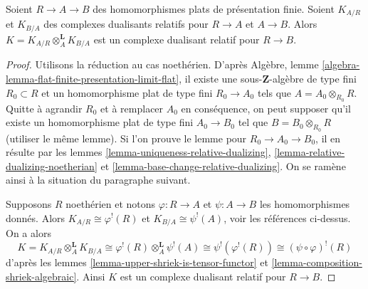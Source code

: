 \begin{lemma}
\label{lemma-relative-dualizing-composition}
Soient $R \to A \to B$ des homomorphismes plats de présentation finie.
Soient $K_{A/R}$ et $K_{B/A}$ des complexes dualisants relatifs pour $R \to A$ et $A \to B$.
Alors $K = K_{A/R} \otimes_A^\mathbf{L} K_{B/A}$ est un complexe dualisant relatif pour $R \to B$.
\end{lemma}

\begin{proof}
Utilisons la réduction au cas noethérien.
D'après Algèbre, lemme \ref{algebra-lemma-flat-finite-presentation-limit-flat}, il existe une sous-$\mathbf{Z}$-algèbre de type fini
$R_0 \subset R$ et un homomorphisme plat de type fini $R_0 \to A_0$ tels que $A = A_0 \otimes_{R_0} R$.
Quitte à agrandir $R_0$ et à remplacer $A_0$ en conséquence,
on peut supposer qu'il existe un homomorphisme plat de type fini $A_0 \to B_0$
tel que $B = B_0 \otimes_{R_0} R$ (utiliser le même lemme).
Si l'on prouve le lemme pour $R_0 \to A_0 \to B_0$, il en résulte
par les lemmes \ref{lemma-uniqueness-relative-dualizing}, \ref{lemma-relative-dualizing-noetherian} et \ref{lemma-base-change-relative-dualizing}.
On se ramène ainsi à la situation du paragraphe suivant.

\medskip\noindent
Supposons $R$ noethérien et notons $\varphi : R \to A$ et $\psi : A \to B$
les homomorphismes donnés. Alors $K_{A/R} \cong \varphi^!(R)$ et $K_{B/A} \cong \psi^!(A)$,
voir les références ci-dessus.
On a alors
$$
K = K_{A/R} \otimes_A^\mathbf{L} K_{B/A} \cong
\varphi^!(R) \otimes_A^\mathbf{L} \psi^!(A) \cong
\psi^!(\varphi^!(R)) \cong (\psi \circ \varphi)^!(R)
$$
d'après les lemmes \ref{lemma-upper-shriek-is-tensor-functor} et \ref{lemma-composition-shriek-algebraic}.
Ainsi $K$ est un complexe dualisant relatif pour $R \to B$.
\end{proof}











